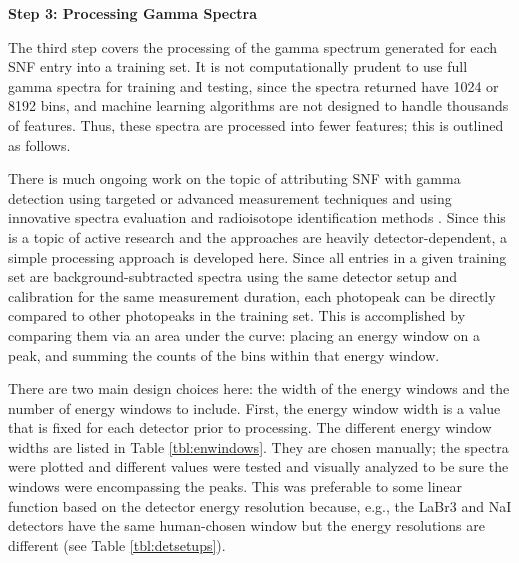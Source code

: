 \noindent \textbf{Step 3: Processing Gamma Spectra}

The third step covers the processing of the gamma spectrum generated for each
\gls{SNF} entry into a training set.  It is not computationally prudent to use
full gamma spectra for training and testing, since the spectra returned have
1024 or 8192 bins, and machine learning algorithms are not designed to handle
thousands of features.  Thus, these spectra are processed into fewer features; 
this is outlined as follows.

There is much ongoing work on the topic of attributing \gls{SNF} with gamma
detection using targeted or advanced measurement techniques \cite{snf_gamma,
compton_supp, bwr_high-res_gamma, pwr_bwr_gamma} and using innovative spectra
evaluation and radioisotope identification methods \cite{riid_09,
rapid_riid_18, sull_gen_07, sull_valid_15, sull_auto_17, sull_unc_17}.   Since
this is a topic of active research and the approaches are heavily
detector-dependent, a simple processing approach is developed here.  Since all
entries in a given training set are background-subtracted spectra using the
same detector setup and calibration for the same measurement duration, each
photopeak can be directly compared to other photopeaks in the training set.
This is accomplished by comparing them via an area under the curve: placing an
energy window on a peak, and summing the counts of the bins within that energy
window. 

There are two main design choices here: the width of the energy windows and the
number of energy windows to include. First, the energy window width is a value
that is fixed for each detector prior to processing.  The different energy
window widths are listed in Table \ref{tbl:enwindows}.  They are chosen
manually; the spectra were plotted and different values were tested and
visually analyzed to be sure the windows were encompassing the peaks. This was
preferable to some linear function based on the detector energy resolution
because, e.g., the \gls{LaBr3} and \gls{NaI} detectors have the same
human-chosen window but the energy resolutions are different (see Table
\ref{tbl:detsetups}). 


